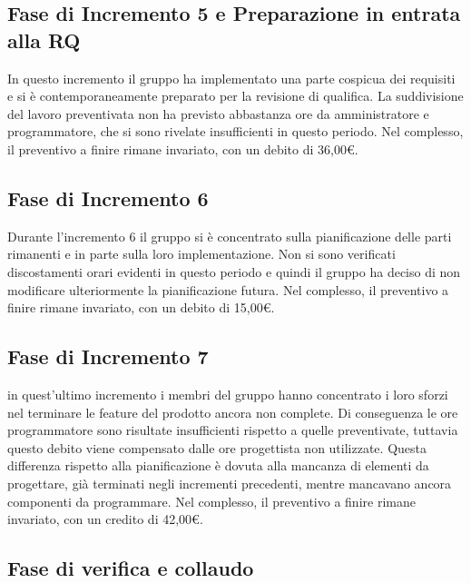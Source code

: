 \documentclass[../piano-di-progetto.tex]{subfiles}
\begin{document}
\subsection{Fase di Incremento 5 e Preparazione in entrata alla RQ}%
\label{sub:preventivo_a_finire/fase_di_incremento_5}

In questo incremento il gruppo ha implementato una parte cospicua dei requisiti e si è contemporaneamente preparato per la revisione di qualifica.
La suddivisione del lavoro preventivata non ha previsto abbastanza ore da amministratore e programmatore, che si sono rivelate insufficienti in questo periodo.
Nel complesso, il preventivo a finire rimane invariato, con un debito di 36,00€.

\subsection{Fase di Incremento 6}%
\label{sub:preventivo_a_finire/fase_di_incremento_6}

Durante l'incremento 6 il gruppo si è concentrato sulla pianificazione delle parti rimanenti e in parte sulla loro implementazione.
Non si sono verificati discostamenti orari evidenti in questo periodo e quindi il gruppo ha deciso di non modificare ulteriormente la pianificazione futura.
Nel complesso, il preventivo a finire rimane invariato, con un debito di 15,00€.


\subsection{Fase di Incremento 7}%
\label{sub:preventivo_a_finire/fase_di_incremento_7}

in quest'ultimo incremento i membri del gruppo hanno concentrato i loro sforzi nel terminare le feature del prodotto ancora non complete.
Di conseguenza le ore programmatore sono risultate insufficienti rispetto a quelle preventivate, tuttavia questo debito viene compensato dalle ore progettista non utilizzate.
Questa differenza rispetto alla pianificazione è dovuta alla mancanza di elementi da progettare, già terminati negli incrementi precedenti, mentre mancavano ancora componenti da programmare.
Nel complesso, il preventivo a finire rimane invariato, con un credito di 42,00€.

\subsection{Fase di verifica e collaudo}%
\label{sub:preventivo_a_finire/fase_di_incremento_4}
\end{document}
